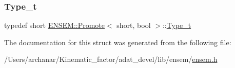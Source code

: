 \subsubsection{\texorpdfstring{Type\_t}{Type\_t}\hspace{0.1cm}{\footnotesize\ttfamily [2/2]}}
{\footnotesize\ttfamily typedef short \mbox{\hyperlink{structENSEM_1_1Promote}{E\+N\+S\+E\+M\+::\+Promote}}$<$ short, bool $>$\+::\mbox{\hyperlink{structENSEM_1_1Promote_3_01short_00_01bool_01_4_a4f58ddab80108afc16273b6a677fcdaf}{Type\+\_\+t}}}



The documentation for this struct was generated from the following file\+:\begin{DoxyCompactItemize}
\item 
/\+Users/archanar/\+Kinematic\+\_\+factor/adat\+\_\+devel/lib/ensem/\mbox{\hyperlink{lib_2ensem_2ensem_8h}{ensem.\+h}}\end{DoxyCompactItemize}
